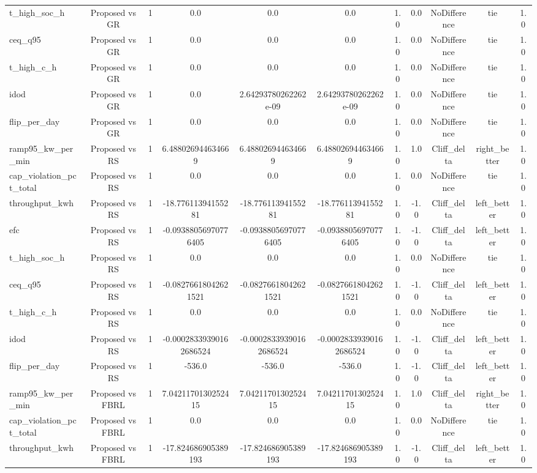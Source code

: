 \begin{table}[t]
\begin{tabular}{lcccccccccc}
t\_high\_soc\_h & Proposed vs GR & 1 & 0.0 & 0.0 & 0.0 & 1.0 & 0.0 & NoDifference & tie & 1.0 \\
ceq\_q95 & Proposed vs GR & 1 & 0.0 & 0.0 & 0.0 & 1.0 & 0.0 & NoDifference & tie & 1.0 \\
t\_high\_c\_h & Proposed vs GR & 1 & 0.0 & 0.0 & 0.0 & 1.0 & 0.0 & NoDifference & tie & 1.0 \\
idod & Proposed vs GR & 1 & 0.0 & 2.64293780262262e-09 & 2.64293780262262e-09 & 1.0 & 0.0 & NoDifference & tie & 1.0 \\
flip\_per\_day & Proposed vs GR & 1 & 0.0 & 0.0 & 0.0 & 1.0 & 0.0 & NoDifference & tie & 1.0 \\
ramp95\_kw\_per\_min & Proposed vs RS & 1 & 6.488026944634669 & 6.488026944634669 & 6.488026944634669 & 1.0 & 1.0 & Cliff\_delta & right\_better & 1.0 \\
cap\_violation\_pct\_total & Proposed vs RS & 1 & 0.0 & 0.0 & 0.0 & 1.0 & 0.0 & NoDifference & tie & 1.0 \\
throughput\_kwh & Proposed vs RS & 1 & -18.77611394155281 & -18.77611394155281 & -18.77611394155281 & 1.0 & -1.0 & Cliff\_delta & left\_better & 1.0 \\
efc & Proposed vs RS & 1 & -0.09388056970776405 & -0.09388056970776405 & -0.09388056970776405 & 1.0 & -1.0 & Cliff\_delta & left\_better & 1.0 \\
t\_high\_soc\_h & Proposed vs RS & 1 & 0.0 & 0.0 & 0.0 & 1.0 & 0.0 & NoDifference & tie & 1.0 \\
ceq\_q95 & Proposed vs RS & 1 & -0.08276618042621521 & -0.08276618042621521 & -0.08276618042621521 & 1.0 & -1.0 & Cliff\_delta & left\_better & 1.0 \\
t\_high\_c\_h & Proposed vs RS & 1 & 0.0 & 0.0 & 0.0 & 1.0 & 0.0 & NoDifference & tie & 1.0 \\
idod & Proposed vs RS & 1 & -0.00028339390162686524 & -0.00028339390162686524 & -0.00028339390162686524 & 1.0 & -1.0 & Cliff\_delta & left\_better & 1.0 \\
flip\_per\_day & Proposed vs RS & 1 & -536.0 & -536.0 & -536.0 & 1.0 & -1.0 & Cliff\_delta & left\_better & 1.0 \\
ramp95\_kw\_per\_min & Proposed vs FBRL & 1 & 7.0421170130252415 & 7.0421170130252415 & 7.0421170130252415 & 1.0 & 1.0 & Cliff\_delta & right\_better & 1.0 \\
cap\_violation\_pct\_total & Proposed vs FBRL & 1 & 0.0 & 0.0 & 0.0 & 1.0 & 0.0 & NoDifference & tie & 1.0 \\
throughput\_kwh & Proposed vs FBRL & 1 & -17.824686905389193 & -17.824686905389193 & -17.824686905389193 & 1.0 & -1.0 & Cliff\_delta & left\_better & 1.0 \\

\end{tabular}
\end{table}
